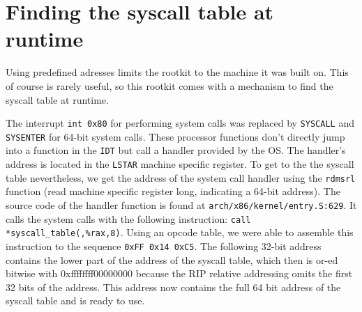 \section{Finding the syscall table at runtime}
Using predefined adresses limits the rootkit to the machine it was 
built on. This of course is rarely useful, so this rootkit comes with a 
mechanism to find the syscall table at runtime. \par
The interrupt \texttt{int 0x80} for performing system calls was replaced by 
\texttt{SYSCALL} and \texttt{SYSENTER} for 64-bit system calls. These processor 
functions don't directly jump into a function in the \texttt{IDT} but call a 
handler provided by the OS. The handler's address is located in the 
\texttt{LSTAR} machine specific register. To get to the the syscall table 
nevertheless, we get the address of the system call handler using the 
\texttt{rdmsrl} function (read 
machine specific register long, indicating a 64-bit address). The source code 
of the handler function is found at \texttt{arch/x86/kernel/entry.S:629}. It 
calls the system calls with the following instruction: 
\verb+call *syscall_table(,%rax,8)+. Using an opcode table, we were able to 
assemble this instruction to the sequence \texttt{0xFF 0x14 0xC5}. The following 
32-bit address contains the lower part of the address of the syscall table,
which then is or-ed bitwise with 0xffffffff00000000 because the RIP 
relative addressing omits the first 32 bits of the address. This address now 
contains the full 64 bit address of the syscall table and is ready to use.
